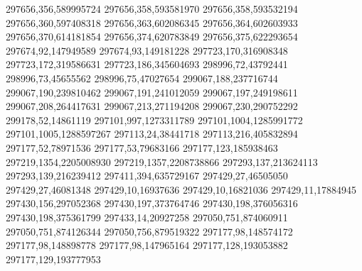 297656,356,589995724
297656,358,593581970
297656,358,593532194
297656,360,597408318
297656,363,602086345
297656,364,602603933
297656,370,614181854
297656,374,620783849
297656,375,622293654
297674,92,147949589
297674,93,149181228
297723,170,316908348
297723,172,319586631
297723,186,345604693
298996,72,43792441
298996,73,45655562
298996,75,47027654
299067,188,237716744
299067,190,239810462
299067,191,241012059
299067,197,249198611
299067,208,264417631
299067,213,271194208
299067,230,290752292
299178,52,14861119
297101,997,1273311789
297101,1004,1285991772
297101,1005,1288597267
297113,24,38441718
297113,216,405832894
297177,52,78971536
297177,53,79683166
297177,123,185938463
297219,1354,2205008930
297219,1357,2208738866
297293,137,213624113
297293,139,216239412
297411,394,635729167
297429,27,46505050
297429,27,46081348
297429,10,16937636
297429,10,16821036
297429,11,17884945
297430,156,297052368
297430,197,373764746
297430,198,376056316
297430,198,375361799
297433,14,20927258
297050,751,874060911
297050,751,874126344
297050,756,879519322
297177,98,148574172
297177,98,148898778
297177,98,147965164
297177,128,193053882
297177,129,193777953
